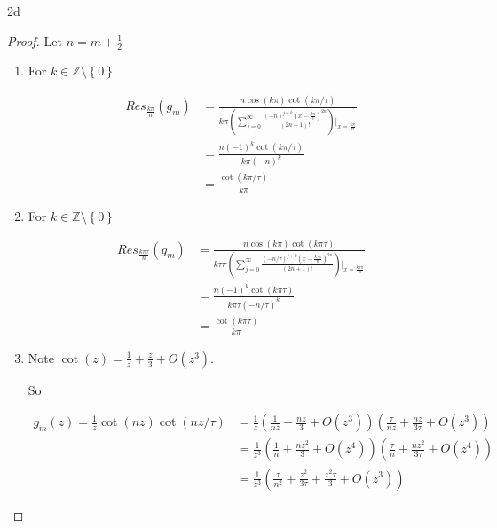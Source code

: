 \documentclass{article}
\newcommand{\Z}{\mathbb{Z}}
\begin{document}
\begin{PROB}{2d}\label{Problem 2d.}
\end{PROB}
\begin{proof}
    Let $n = m + \frac{1}{2}$ 
    \begin{enumerate}
        \item For $k \in \Z \setminus \left\{ 0 \right\}$  
        
        \begin{align*}
            Res_{\frac{k \pi}{n}}(g_m) &= \frac{n \cos(k \pi) \cot(k \pi / \tau)}{k \pi \left(
                \sum_{j = 0}^\infty\frac{(-n)^{j + k}(x - \frac{k \pi}{n})^{2n}}{(2n + 1)!}
            \right)|_{x = \frac{k \pi}{n}}} \\
            &= \frac{n (-1)^{k} \cot(k \pi / \tau)}{k \pi (-n)^k} \\
            &= \frac{ \cot(k \pi / \tau)}{k \pi}
        \end{align*}

        \item For $k \in \Z \setminus \left\{ 0 \right\}$  
        
        \begin{align*}
            Res_{\frac{k \pi \tau}{n}}(g_m) &= \frac{n \cos(k \pi ) \cot(k \pi \tau)}{k \tau \pi \left(
                \sum_{j = 0}^\infty\frac{(-n / \tau)^{j + k}(x - \frac{k \tau \pi}{n})^{2n}}{(2n + 1)!}
            \right)|_{x = \frac{k \tau \pi}{n}}} \\
            &= \frac{n (-1)^{k} \cot(k \pi \tau)}{k \pi \tau (-n / \tau)^k} \\
            &= \frac{ \cot(k \pi \tau)}{k \pi}
        \end{align*}

        \item Note $\cot(z) = \frac{1}{z} + \frac{z}{3} + O(z^3)$. 
        
        So 

        \begin{align*}
            g_m(z) = \frac{1}{z} \cot(nz) \cot(n z / \tau) &= \frac{1}{z} \left(\frac{1}{nz} + \frac{nz}{3} + O(z^3)\right) \left(\frac{\tau}{ nz} + \frac{n z}{3 \tau} + O(z^3)\right) \\
            &= \frac{1}{z^3} \left(\frac{1}{n} + \frac{nz^2}{3} + O(z^4)\right) \left(\frac{\tau}{n} + \frac{n z^2}{3 \tau} + O(z^4)\right) \\
            &= \frac{1}{z^3} \left(\frac{\tau}{n^2} + \frac{z^2}{3 \tau} + \frac{z^2 \tau}{3} + O(z^3)\right)
        \end{align*}


\end{enumerate}
\end{proof}
\end{document}
